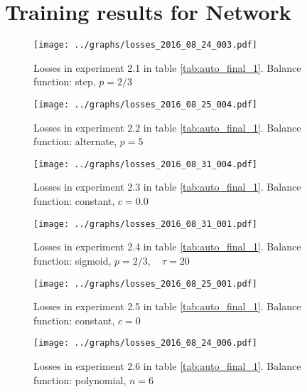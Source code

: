 \appendix
\chapter{Training results for Network \networkII} \label{appendix2}


      \begin{figure}[!h]
      \centering
      \texttt{[image: ../graphs/losses\_2016\_08\_24\_003.pdf]}
      \caption{Losses in experiment 2.1 in table \ref{tab:auto_final_1}. Balance function: step, $p=2/3$}
      \label{fig:alt1ernate}
      \end{figure}

      \begin{figure}[!h]
      \centering
      \texttt{[image: ../graphs/losses\_2016\_08\_25\_004.pdf]}
      \caption{Losses in experiment 2.2 in table \ref{tab:auto_final_1}. Balance function: alternate, $p=5$}
      \label{fig:alt2rnate}
      \end{figure}

      \begin{figure}[!h]
      \centering \texttt{[image: ../graphs/losses\_2016\_08\_31\_004.pdf]}
      \caption{Losses in experiment 2.3 in table \ref{tab:auto_final_1}. Balance function: constant, $c=0.0$}
      \label{fig:alter3nate} \end{figure}

      \begin{figure}[!h]
      \centering
      \texttt{[image: ../graphs/losses\_2016\_08\_31\_001.pdf]}
      \caption{Losses in experiment 2.4 in table \ref{tab:auto_final_1}. Balance function: sigmoid, $p=2/3,\quad \tau=20$}
      \label{fig:alter4nate}
      \end{figure}

      \begin{figure}[!h]
      \centering
      \texttt{[image: ../graphs/losses\_2016\_08\_25\_001.pdf]}
      \caption{Losses in experiment 2.5 in table \ref{tab:auto_final_1}. Balance function: constant, $c=0$}
      \label{fig:altern5ate}
      \end{figure}

      \begin{figure}[!h]
      \centering
      \texttt{[image: ../graphs/losses\_2016\_08\_24\_006.pdf]}
      \caption{Losses in experiment 2.6 in table \ref{tab:auto_final_1}. Balance function: polynomial, $n=6$}
      \label{fig:altern6ate}
      \end{figure}


